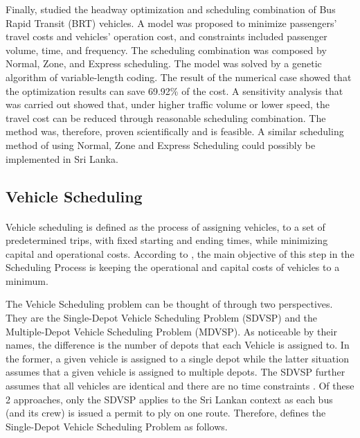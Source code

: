Finally, \cite{Sun2008} studied the headway optimization and scheduling combination of Bus Rapid Transit (BRT) vehicles. A model was proposed to minimize passengers' travel costs and vehicles' operation cost, and constraints included passenger volume, time, and frequency. The scheduling combination was composed by Normal, Zone, and Express scheduling. The model was solved by a genetic algorithm of variable-length coding. The result of the numerical case showed that the optimization results can save 69.92\% of the cost. A sensitivity analysis that was carried out showed that, under higher traffic volume or lower speed, the travel cost can be reduced through reasonable scheduling combination. The method was, therefore, proven scientifically and is feasible. A similar scheduling method of using Normal, Zone and Express Scheduling could possibly be implemented in Sri Lanka.

\subsection{Vehicle Scheduling}

\paragraph{ } Vehicle scheduling is defined as the process of assigning vehicles, to a set of predetermined trips, with fixed starting and ending times, while minimizing capital and operational costs. According to \cite{Freling2003}, the main objective of this step in the Scheduling Process is keeping the operational and capital costs of vehicles to a minimum.

The Vehicle Scheduling problem can be thought of through two perspectives. They are the Single-Depot Vehicle Scheduling Problem (SDVSP) and the Multiple-Depot Vehicle Scheduling Problem (MDVSP). As noticeable by their names, the difference is the number of depots that each Vehicle is assigned to. In the former, a given vehicle is assigned to a single depot while the latter situation assumes that a given vehicle is assigned to multiple depots. The SDVSP further assumes that all vehicles are identical and there are no time constraints \cite{Huisman2004}. Of these 2 approaches, only the SDVSP applies to the Sri Lankan context as each bus (and its crew) is issued a permit to ply on one route. Therefore, \cite{Freling2003} defines the Single-Depot Vehicle Scheduling Problem as follows.

